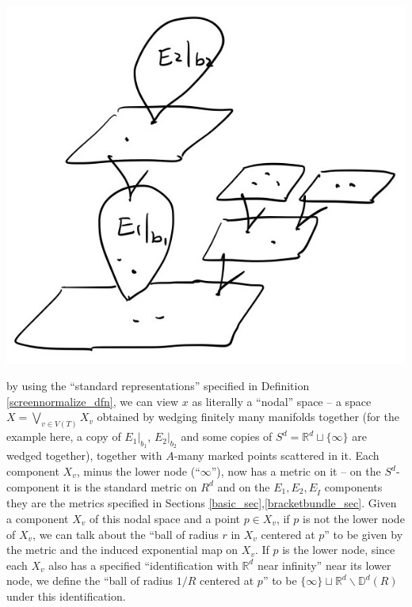 \documentclass[11pt]{article}
\theoremstyle{definition}
\theoremstyle{remark}
\def\mr#1{{\mathring{#1}}}
\def\R{\mathbb{R}}
\def\D{\mathbb{D}}
\begin{document}
\includegraphics[scale=0.15]{x_fig}

by using the ``standard representations'' specified in Definition \ref{screennormalize_dfn}, 
we can view $x$ as literally a ``nodal'' space -- a space $X=\bigvee_{v\in V(T)}X_v$ obtained by wedging finitely many manifolds together (for the example here, a copy of $E_1|_{b_1}$, $E_2|_{b_2}$ and some copies of $S^d=\R^d\sqcup\{\infty\}$ are wedged together), together with $A$-many marked points scattered in it. 
Each component $X_v$, minus the lower node (``$\infty$''), now has a metric on it -- on the $S^d$-component it is the standard metric on $R^d$ and on the $E_1,E_2,E_{\mr{I}}$ components they are the metrics specified in Sections \ref{basic_sec},\ref{bracketbundle_sec}. 
Given a component $X_v$ of this nodal space and a point $p\in X_v$, if $p$ is not the lower node of $X_v$, we can talk about the ``ball of radius $r$ in $X_v$ centered at $p$'' to be given by the metric and the induced exponential map on $X_v$. 
If $p$ is the lower node, since each $X_v$ also has a specified ``identification with $\R^d$ near infinity'' near its lower node, we define the ``ball of radius $1/R$ centered at $p$'' to be $\{\infty\}\sqcup\R^d\backslash\D^d(R)$ under this identification. 
\end{document}
